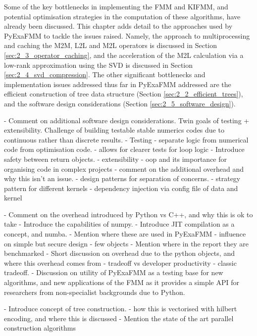 Some of the key bottlenecks in implementing the \gls{FMM} and \gls{KIFMM}, and potential
optimisation strategies in the computation of these algorithms, have already been
discussed. This chapter adds detail to the approaches used by \gls{PyExaFMM} to tackle
the issues raised. Namely, the approach to multiprocessing and caching the \gls{M2M},
\gls{L2L} and \gls{M2L} operators is discussed in Section \ref{sec:2_3_operator_caching}, and
the acceleration of the \gls{M2L} calculation via a low-rank approximation using the \gls{SVD}
is discussed in Section \ref{sec:2_4_svd_compression}. The other significant bottlenecks
and implementation issues addressed thus far in \gls{PyExaFMM} addressed are the
efficient construction of tree data structure (Section \ref{sec:2_2_efficient_trees}),
and the software design considerations (Section \ref{sec:2_5_software_design}).


- Comment on additional software design considerations. Twin goals of testing
+ extensibility. Challenge of building testable stable numerics codes due to
continuous rather than discrete results.
    - Testing
        - separate logic from numerical code from optimisation code.
            - allows for clearer tests for loop logic
        - Introduce safety between return objects.
    - extensibility
        - oop and its importance for organising code in complex projects
            - comment on the additional overhead and why this isn't an issue.
        - design patterns for separation of concerns.
            - strategy pattern for different kernels
            - dependency injection via config file of data and kernel

- Comment on the overhead introduced by Python vs C++, and why this is ok to take
    - Introduce the capabilities of numpy.
    - Introduce JIT compilation as a concept, and numba.
    - Mention where these are used in PyExaFMM
    - influence on simple but secure design - few objects
    - Mention where in the report they are benchmarked
    - Short discussion on overhead due to the python objects, and where this
    overhead comes from - tradeoff vs developer productivity - classic tradeoff.
    - Discussion on utility of PyExaFMM as a testing base for new algorithms,
    and new applications of the FMM as it provides a simple API for researchers
    from non-specialist backgrounds due to Python.

- Introduce concept of tree construction.
    - how this is vectorised with hilbert encoding, and where this is discussed
    - Mention the state of the art parallel construction algorithms
